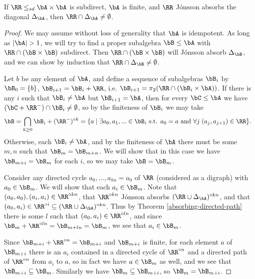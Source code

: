 \begin{thm}\label{absorbing-diagonal} If $\RR \le_{sd} \bA\times \bA$ is subdirect, $\bA$ is finite, and $\RR$ J\'onsson absorbs the diagonal $\Delta_\bA$, then $\RR \cap \Delta_\bA \ne \emptyset$.
\end{thm}
\begin{proof} We may assume without loss of generality that $\bA$ is idempotent. As long as $|\bA| > 1$, we will try to find a proper subalgebra $\bB \le \bA$ with $\RR \cap (\bB \times \bB)$ subdirect. Then $\RR\cap (\bB\times \bB)$ will J\'onsson absorb $\Delta_{\bB}$, and we can show by induction that $\RR \cap \Delta_{\bB} \ne \emptyset$.

Let $b$ be any element of $\bA$, and define a sequence of subalgebras $\bB_i$ by $\bB_0 = \{b\}$, $\bB_{i+1} = \bB_i + \RR$, i.e. $\bB_{i+1} = \pi_2(\RR \cap (\bB_i \times \bA))$. If there is any $i$ such that $\bB_i \ne \bA$ but $\bB_{i+1} = \bA$, then for every $\bC \le \bA$ we have $(\bC + \RR^-) \cap \bB_i \ne \emptyset$, so by the finiteness of $\bB_i$ we may take
\[
\bB = \bigcap_{k \ge 0} \bB_i+(\RR^-)^{\circ k} = \{a \mid \exists a_0, a_1, ... \in \bB_i \text{ s.t. } a_0 = a \text{ and } \forall j \; (a_j,a_{j+1}) \in \RR\}.
\]
Otherwise, each $\bB_i \ne \bA$, and by the finiteness of $\bA$ there must be some $m,n$ such that $\bB_m = \bB_{m+n}$. We will show that in this case we have $\bB_{m+i} = \bB_m$ for each $i$, so we may take $\bB = \bB_m$.

Consider any directed cycle $a_0, ..., a_{kn} = a_0$ of $\RR$ (considered as a digraph) with $a_0 \in \bB_m$. We will show that each $a_i \in \bB_m$. Note that $(a_0,a_0), (a_i,a_i) \in \RR^{\circ kn}$, that $\RR^{\circ kn}$ J\'onsson absorbs $(\RR\cup\Delta_{\bA})^{\circ kn}$, and that $(a_0,a_i) \in \RR^{\circ i} \subseteq (\RR\cup\Delta_{\bA})^{\circ kn}$. Thus by Theorem \ref{absorbing-directed-path} there is some $l$ such that $(a_0,a_i) \in \RR^{\circ ln}$, and since $\bB_m + \RR^{\circ ln} = \bB_{m+ln} = \bB_m$, we see that $a_i \in \bB_m$.

Since $\bB_{m+i} + \RR^{\circ n} = \bB_{m+i}$ and $\bB_{m+i}$ is finite, for each element $a$ of $\bB_{m+i}$ there is an $a_i$ contained in a directed cycle of $\RR^{\circ n}$ and a directed path of $\RR^{\circ n}$ from $a_i$ to $a$, so in fact we have $a \in \bB_m$ as well, and we see that $\bB_{m+i} \subseteq \bB_m$. Similarly we have $\bB_m \subseteq \bB_{m+i}$, so $\bB_m = \bB_{m+i}$.
\end{proof}

